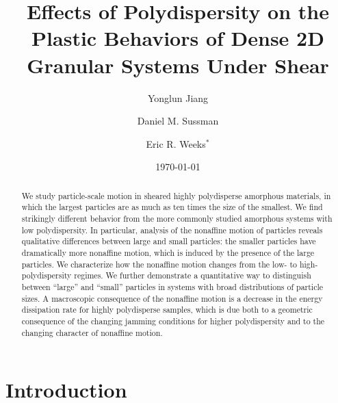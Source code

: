 \documentclass[%
 reprint,
 amsmath,amssymb,
 aps,
]{revtex4-2}
\begin{document}
\title{Effects of Polydispersity on the Plastic Behaviors of Dense 2D Granular Systems Under Shear}
\author{Yonglun Jiang}

\author{Daniel M. Sussman}

\author{Eric R. Weeks$^*$}

\date{\today}%

\begin{abstract}
We study particle-scale motion in sheared highly polydisperse amorphous materials, in which the largest particles are as much as ten times the size of the smallest. We find strikingly different behavior from the more commonly studied amorphous systems with low polydispersity.  In particular, analysis of the nonaffine motion of particles reveals qualitative differences between large and small particles: the smaller particles have dramatically more nonaffine motion, which is induced by the presence of the large particles.  We characterize how the nonaffine motion changes from the low- to high-polydispersity regimes.  We further demonstrate a quantitative way to distinguish between ``large'' and ``small'' particles in systems with broad distributions of particle sizes.  A macroscopic consequence of the nonaffine motion is a decrease in the energy dissipation rate for highly polydisperse samples, which is due both to a geometric consequence of the changing jamming conditions for higher polydispersity and to the changing character of nonaffine motion. 
\end{abstract}

\maketitle


\section{Introduction}
\label{intro}
\end{document}
